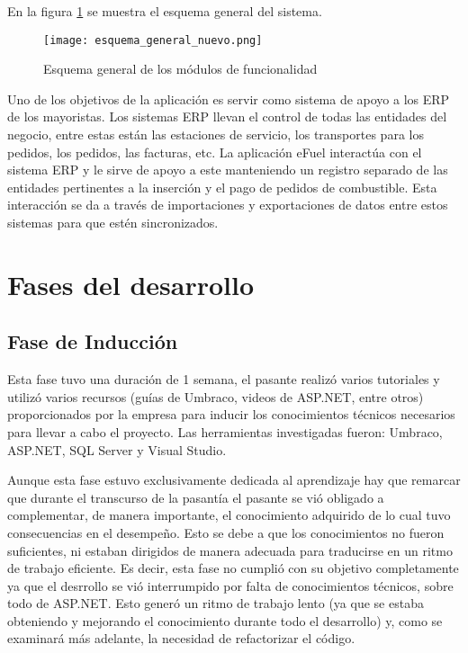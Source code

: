 En la figura \ref{fig:esquema_general_nuevo} se muestra el esquema general del sistema.

\begin{figure}[ht]
    \texttt{[image: esquema\_general\_nuevo.png]}
    \caption{Esquema general de los módulos de funcionalidad}
    \label{fig:esquema_general_nuevo}
    \centering
\end{figure}

Uno de los objetivos de la aplicación es servir como sistema de apoyo a los ERP de los mayoristas. Los sistemas ERP llevan el control de todas las entidades del negocio, entre estas están las estaciones de servicio, los transportes para los pedidos, los pedidos, las facturas, etc. La aplicación eFuel interactúa con el sistema ERP y le sirve de apoyo a este manteniendo un registro separado de las entidades pertinentes a la inserción y el pago de pedidos de combustible. Esta interacción se da a través de importaciones y exportaciones de datos entre estos sistemas para que estén sincronizados.

\section{Fases del desarrollo}
\subsection{Fase de Inducción}
Esta fase tuvo una duración de 1 semana, el pasante realizó varios tutoriales y utilizó varios recursos (guías de Umbraco, videos de ASP.NET, entre otros) proporcionados por la empresa para inducir los conocimientos técnicos necesarios para llevar a cabo el proyecto. Las herramientas investigadas fueron: Umbraco, ASP.NET, SQL Server y Visual Studio.

Aunque esta fase estuvo exclusivamente dedicada al aprendizaje hay que remarcar que durante el transcurso de la pasantía el pasante se vió obligado a complementar, de manera importante, el conocimiento adquirido de lo cual tuvo consecuencias en el desempeño. Esto se debe a que los conocimientos no fueron suficientes, ni estaban dirigidos de manera adecuada para traducirse en un ritmo de trabajo eficiente. Es decir, esta fase no cumplió con su objetivo completamente ya que el desrrollo se vió interrumpido por falta de conocimientos técnicos, sobre todo de ASP.NET. Esto generó un ritmo de trabajo lento (ya que se estaba obteniendo y mejorando el conocimiento durante todo el desarrollo) y, como se examinará más adelante, la necesidad de refactorizar el código.

